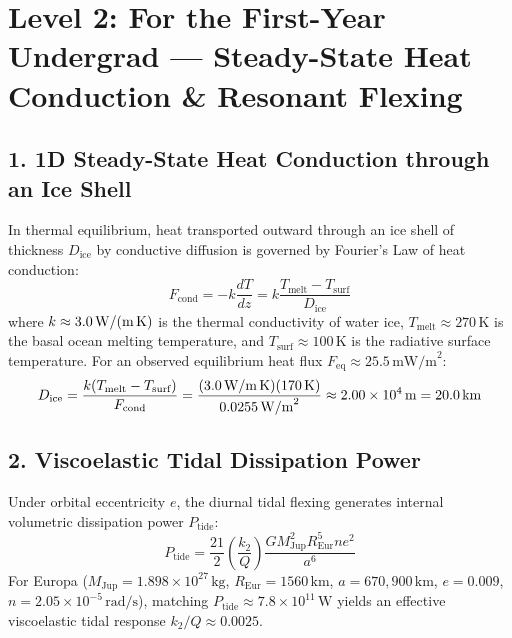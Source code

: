 \documentclass[11pt,a4paper]{article}
\begin{document}
\newpage

\section*{Level 2: For the First-Year Undergrad — Steady-State Heat Conduction \& Resonant Flexing}

\subsection*{1. 1D Steady-State Heat Conduction through an Ice Shell}
In thermal equilibrium, heat transported outward through an ice shell of thickness $D_{\text{ice}}$ by conductive diffusion is governed by Fourier's Law of heat conduction:
\begin{equation}
F_{\text{cond}} = -k \frac{dT}{dz} = k \frac{T_{\text{melt}} - T_{\text{surf}}}{D_{\text{ice}}}
\end{equation}
where $k \approx 3.0\,\text{W/(m\,K)}$ is the thermal conductivity of water ice, $T_{\text{melt}} \approx 270\,\text{K}$ is the basal ocean melting temperature, and $T_{\text{surf}} \approx 100\,\text{K}$ is the radiative surface temperature.
For an observed equilibrium heat flux $F_{\text{eq}} \approx 25.5\,\text{mW/m}^2$:
\begin{equation}
D_{\text{ice}} = \frac{k (T_{\text{melt}} - T_{\text{surf}})}{F_{\text{cond}}} = \frac{(3.0\,\text{W/m\,K})(170\,\text{K})}{0.0255\,\text{W/m}^2} \approx 2.00 \times 10^4\,\text{m} = 20.0\,\text{km}
\end{equation}

\subsection*{2. Viscoelastic Tidal Dissipation Power}
Under orbital eccentricity $e$, the diurnal tidal flexing generates internal volumetric dissipation power $P_{\text{tide}}$:
\begin{equation}
P_{\text{tide}} = \frac{21}{2} \left(\frac{k_2}{Q}\right) \frac{G M_{\text{Jup}}^2 R_{\text{Eur}}^5 n e^2}{a^6}
\end{equation}
For Europa ($M_{\text{Jup}} = 1.898 \times 10^{27}\,\text{kg}$, $R_{\text{Eur}} = 1560\,\text{km}$, $a = 670,900\,\text{km}$, $e = 0.009$, $n = 2.05 \times 10^{-5}\,\text{rad/s}$), matching $P_{\text{tide}} \approx 7.8 \times 10^{11}\,\text{W}$ yields an effective viscoelastic tidal response $k_2 / Q \approx 0.0025$.
\end{document}
